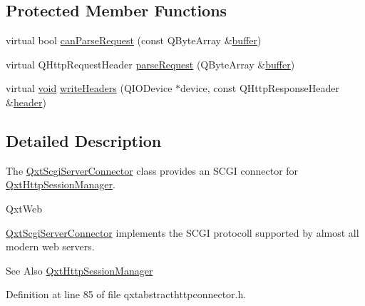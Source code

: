 \subsection*{Protected Member Functions}
\begin{DoxyCompactItemize}
\item 
virtual bool \hyperlink{class_qxt_scgi_server_connector_a7c3e457e293b3386a8164a61ed7553fb}{can\-Parse\-Request} (const Q\-Byte\-Array \&\hyperlink{glext_8h_af1b5122dc7bfe0a6319e14419cfe3423}{buffer})
\item 
virtual Q\-Http\-Request\-Header \hyperlink{class_qxt_scgi_server_connector_a1297ce388834ed8733c2270583c5a77e}{parse\-Request} (Q\-Byte\-Array \&\hyperlink{glext_8h_af1b5122dc7bfe0a6319e14419cfe3423}{buffer})
\item 
virtual \hyperlink{group___u_a_v_objects_plugin_ga444cf2ff3f0ecbe028adce838d373f5c}{void} \hyperlink{class_qxt_scgi_server_connector_a0d06c5a86040c9fd6fcc9c8eebf931db}{write\-Headers} (Q\-I\-O\-Device $\ast$device, const Q\-Http\-Response\-Header \&\hyperlink{crypt_8h_ae4f2f0852899a81dcd9b8a02e559f0f7}{header})
\end{DoxyCompactItemize}


\subsection{Detailed Description}
The \hyperlink{class_qxt_scgi_server_connector}{Qxt\-Scgi\-Server\-Connector} class provides an S\-C\-G\-I connector for \hyperlink{class_qxt_http_session_manager}{Qxt\-Http\-Session\-Manager}. 

Qxt\-Web

\hyperlink{class_qxt_scgi_server_connector}{Qxt\-Scgi\-Server\-Connector} implements the S\-C\-G\-I protocoll supported by almost all modern web servers.

\begin{DoxySeeAlso}{See Also}
\hyperlink{class_qxt_http_session_manager}{Qxt\-Http\-Session\-Manager} 
\end{DoxySeeAlso}


Definition at line 85 of file qxtabstracthttpconnector.\-h.



